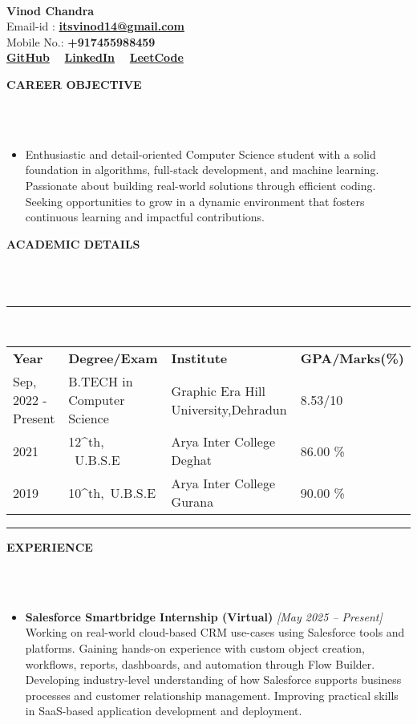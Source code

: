 \documentclass[a4paper,10pt]{article}
\newcommand{\lsep}{-0.5cm}
\newcommand{\resheading}[1]{{\small \colorbox{mygrey}{\begin{minipage}{0.975\textwidth}{\textbf{#1 \vphantom{p\^{E}}}}\end{minipage}}}}
\begin{document}
\hspace{0.5cm}\\[-0.2cm]

\textbf{Vinod Chandra} \\
\indent Email-id : \textbf{\url{itsvinod14@gmail.com}} \\
\indent Mobile No.: \textbf{+917455988459} \\
\indent \textbf{\href{https://github.com/VinodPandey14}{GitHub}} \ \ \textbf{\href{https://www.linkedin.com/in/vinod-pandey14/}{LinkedIn}} \ \ \textbf{\href{https://leetcode.com/u/Vinod-Pandey/}{LeetCode}} \\

\resheading{\textbf{CAREER OBJECTIVE} }\\[\lsep]
\\
\begin{itemize}
\setlength\itemsep{0.5em}
\item Enthusiastic and detail-oriented Computer Science student with a solid foundation in algorithms, full-stack development, and machine learning. Passionate about building real-world solutions through efficient coding. Seeking opportunities to grow in a dynamic environment that fosters continuous learning and impactful contributions.
\end{itemize}

\resheading{\textbf{ACADEMIC DETAILS} }\\[\lsep]
\\
\indent \rule{6.8in}{0.4pt}\\
\indent \begin{tabular}{ l @{\hskip 0.15in} l @{\hskip 0.15in} l @{\hskip 0.15in} l @{\hskip 0.15in} }
\noindent \textbf{Year} & \textbf{Degree/Exam} & \textbf{Institute} & \textbf{GPA/Marks(\%)}\\
Sep, 2022 - Present & B.TECH in Computer Science & Graphic Era Hill University,Dehradun & 8.53/10\\
2021 & 12^{th}, \ U.B.S.E & Arya Inter College Deghat & 86.00 \% \\
2019 & 10^{th},\ U.B.S.E & Arya Inter College Gurana & 90.00 \%\\
\end{tabular}
\indent \rule{6.8in}{0.4pt}

\resheading{\textbf{EXPERIENCE}}\\[\lsep]
\\
\begin{itemize}
\setlength\itemsep{0.5em}
\item \textbf{Salesforce Smartbridge Internship (Virtual)} \hfill \textit{[May 2025 – Present]}\\
Working on real-world cloud-based CRM use-cases using Salesforce tools and platforms. Gaining hands-on experience with custom object creation, workflows, reports, dashboards, and automation through Flow Builder. Developing industry-level understanding of how Salesforce supports business processes and customer relationship management. Improving practical skills in SaaS-based application development and deployment.
\end{itemize}
\end{document}
